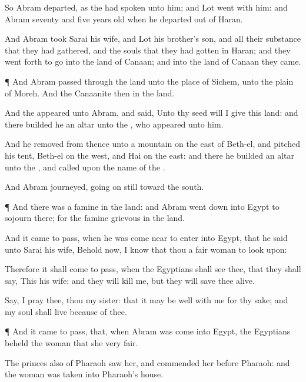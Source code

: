 {\par }{\PP {}So
Abram
departed, as the
{} had
spoken unto him; and
Lot
went with him: and
Abram
{}
seventy and
five
years
old when he
departed out of
Haran.

And
Abram
took
Sarai his
wife, and
Lot his
brother’s
son, and all their
substance that they had
gathered, and the
souls that they had
gotten in
Haran; and they went
forth to
go into the
land of
Canaan; and into the
land of
Canaan they
came.


\par }{\PP {}¶ And
Abram passed
through the
land unto the
place of
Sichem, unto the
plain of
Moreh. And the
Canaanite
{}
then in the
land.

And the
{}
appeared unto
Abram, and
said, Unto thy
seed will I
give
this
land: and there
builded he an
altar unto the
{}, who
appeared unto him.

And he
removed from thence unto a
mountain on the
east of
Beth-el, and
pitched his
tent,
{}
Beth-el on the
west, and
Hai on the
east: and there he
builded an
altar unto the
{}, and
called upon the
name of the
{}.

And
Abram
journeyed, going
on
still toward the
south.


\par }{\PP {}¶ And there was a
famine in the
land: and
Abram went
down into
Egypt to
sojourn there; for the
famine
{}
grievous in the
land.

And it came to pass,
when he was come
near to
enter into
Egypt, that he
said unto
Sarai his
wife,
Behold
now, I
know that thou
{} a
fair
woman to look
upon:

Therefore it shall come to pass, when the
Egyptians shall
see thee, that they shall
say, This
{} his
wife: and they will
kill me, but they will save thee
alive.

Say, I pray
thee, thou
{} my
sister:
that it may be
well with me for thy sake; and my
soul shall
live because of
thee.


\par }{\PP {}¶ And it came to pass, that, when
Abram was
come into
Egypt, the
Egyptians
beheld the
woman that she
{}
very
fair.

The
princes also of
Pharaoh
saw her, and
commended her
before
Pharaoh: and the
woman was
taken into
Pharaoh’s
house.

}
